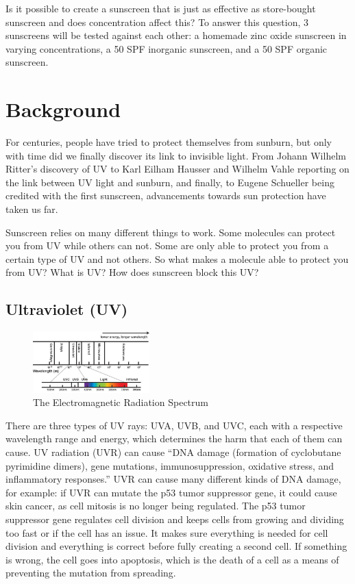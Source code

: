 \documentclass{article}
\begin{document}
Is it possible to create a sunscreen that is just as effective as store-bought sunscreen and does concentration affect this? To answer this question, 3 sunscreens will be tested against each other: a homemade zinc oxide sunscreen in varying concentrations, a 50 SPF inorganic sunscreen, and a 50 SPF organic sunscreen.



\section{Background}
For centuries, people have tried to protect themselves from sunburn, but only with time did we finally discover its link to invisible light. From Johann Wilhelm Ritter’s discovery of UV to Karl Eilham Hausser and Wilhelm Vahle reporting on the link between UV light and sunburn, and finally, to Eugene Schueller being credited with the first sunscreen, advancements towards sun protection have taken us far.

Sunscreen relies on many different things to work. Some molecules can protect you from UV while others can not. Some are only able to protect you from a certain type of UV and not others. So what makes a molecule able to protect you from UV? What is UV? How does sunscreen block this UV?

\subsection{Ultraviolet (UV)}
\begin{figure}
  \centering
  \caption{The Electromagnetic Radiation Spectrum \cite{canada_what_2011}}
  \includegraphics[width=0.4\textwidth]{EMRSpectrum.jpg}
\end{figure}
There are three types of UV rays: UVA, UVB, and UVC, each with a respective wavelength range and energy, which determines the harm that each of them can cause. UV radiation (UVR) can cause “DNA damage (formation of cyclobutane pyrimidine dimers), gene mutations, immunosuppression, oxidative stress, and inflammatory responses.” \cite{fox_review_2010} UVR can cause many different kinds of DNA damage, for example: if UVR can mutate the p53 tumor suppressor gene, it could cause skin cancer, as cell mitosis is no longer being regulated. The p53 tumor suppressor gene regulates cell division and keeps cells from growing and dividing too fast or if the cell has an issue. It makes sure everything is needed for cell division and everything is correct before fully creating a second cell. If something is wrong, the cell goes into apoptosis, which is the death of a cell as a means of preventing the mutation from spreading.
\end{document}
